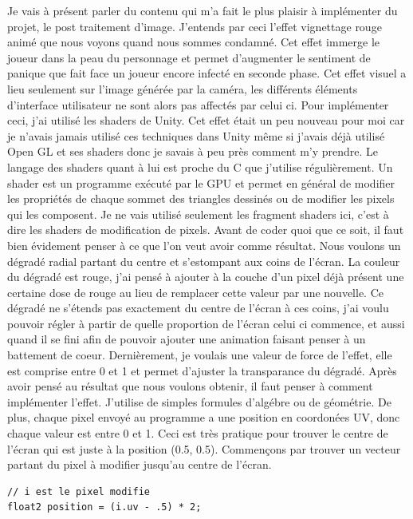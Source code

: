 \documentclass{article}
\begin{document}
Je vais à présent parler du contenu qui m'a fait le plus plaisir à implémenter du projet, le post traitement d'image. J'entends par ceci l'effet vignettage rouge animé que nous voyons quand nous sommes condamné. Cet effet immerge le joueur dans la peau du personnage et permet d'augmenter le sentiment de panique que fait face un joueur encore infecté en seconde phase. Cet effet visuel a lieu seulement sur l'image générée par la caméra, les différents éléments d'interface utilisateur ne sont alors pas affectés par celui ci.
Pour implémenter ceci, j'ai utilisé les shaders de Unity. Cet effet était un peu nouveau pour moi car je n'avais jamais utilisé ces techniques dans Unity même si j'avais déjà utilisé Open GL et ses shaders donc je savais à peu près comment m'y prendre. Le langage des shaders quant à lui est proche du C que j'utilise régulièrement. Un shader est un programme exécuté par le GPU et permet en général de modifier les propriétés de chaque sommet des triangles dessinés ou de modifier les pixels qui les composent. Je ne vais utilisé seulement les fragment shaders ici, c'est à dire les shaders de modification de pixels.
Avant de coder quoi que ce soit, il faut bien évidement penser à ce que l'on veut avoir comme résultat.
Nous voulons un dégradé radial partant du centre et s'estompant aux coins de l'écran. La couleur du dégradé est rouge, j'ai pensé à ajouter à la couche d'un pixel déjà présent une certaine dose de rouge au lieu de remplacer cette valeur par une nouvelle. Ce dégradé ne s'étends pas exactement du centre de l'écran à ces coins, j'ai voulu pouvoir régler à partir de quelle proportion de l'écran celui ci commence, et aussi quand il se fini afin de pouvoir ajouter une animation faisant penser à un battement de coeur. Dernièrement, je voulais une valeur de force de l'effet, elle est comprise entre 0 et 1 et permet d'ajuster la transparance du dégradé.
Après avoir pensé au résultat que nous voulons obtenir, il faut penser à comment implémenter l'effet. J'utilise de simples formules d'algébre ou de géométrie. De plus, chaque pixel envoyé au programme a une position en coordonées UV, donc chaque valeur est entre 0 et 1. Ceci est très pratique pour trouver le centre de l'écran qui est juste à la position (0.5, 0.5).
Commençons par trouver un vecteur partant du pixel à modifier jusqu'au centre de l'écran.

\begin{lstlisting}
// i est le pixel modifie
float2 position = (i.uv - .5) * 2;
\end{lstlisting}
\end{document}
